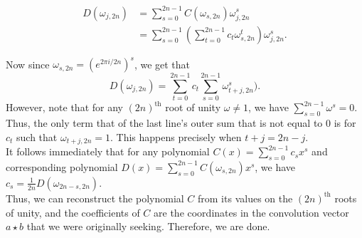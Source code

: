 \begin{align*}
D(\omega_{j, 2n}) &= \sum_{s = 0}^{2n - 1} C(\omega_{s, 2n}) \omega_{j, 2n}^{s} \\[1em]
&= \sum_{s=0}^{2n - 1}\left( \sum_{t = 0}^{2n - 1} c_{t} \omega_{s, 2n}^{t} \right)\omega_{j, 2n}^{s}. 
\end{align*}

Now since $\omega_{s, 2n} = (e^{2\pi i/2n})^{s}$, we get that 
\[ 
D(\omega_{j, 2n}) = \sum_{t=0}^{2n - 1}c_t \sum_{s = 0}^{2n - 1} \omega_{t + j, 2n}^{s}).
\]
However, note that for any $(2n)^{\text{th}}$ root of unity $\omega \neq 1$, we have $\sum_{s = 0}^{2n - 1} \omega^{s} = 0$. Thus, the only term that of the last line's outer sum that is not equal to $0$ is for $c_t$ such that $\omega_{t + j, 2n} = 1$. This happens precisely when $t + j = 2n - j$. \\

It follows immediately that for any polynomial $C(x) = \sum_{s = 0}^{2n - 1}c_sx^{s}$ and corresponding polynomial $D(x) = \sum_{s = 0}^{2n - 1} C(\omega_{s, 2n}) x^{s}$, we have $c_s = \frac{1}{2n} D(\omega_{2n - s, 2n})$.  \\

Thus, we can reconstruct the polynomial $C$ from its values on the $(2n)^{\text{th}}$ roots of unity, and the coefficients of $C$ are the coordinates in the convolution vector $a \star b$ that we were originally seeking. Therefore, we are done.